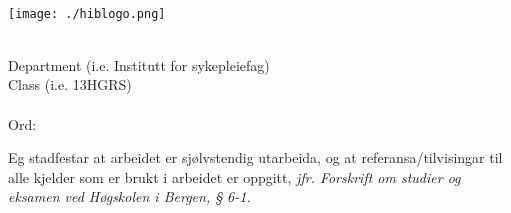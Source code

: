 \begin{titlepage}
\begin{center}

{%
    \hfill \forfattar\\[1cm]
}

\texttt{[image: ./hiblogo.png]}~\\[4cm]

{%
    \huge \bfseries \tittel \\[4cm]
}

{%
    \large Department (i.e. Institutt for sykepleiefag)\\
    \large Class (i.e. 13HGRS)\\
    \large \dato\\
    \large Ord: 
}

{%
    \begin{center}
         Eg stadfestar at arbeidet er sjølvstendig utarbeida, og at referansa/tilvisingar til alle kjelder som er brukt i arbeidet er oppgitt,
         \textit{jfr. Forskrift om studier og eksamen ved Høgskolen i Bergen, § 6-1.}
     \end{center}
 }

\vfill

\end{center}
\end{titlepage}
